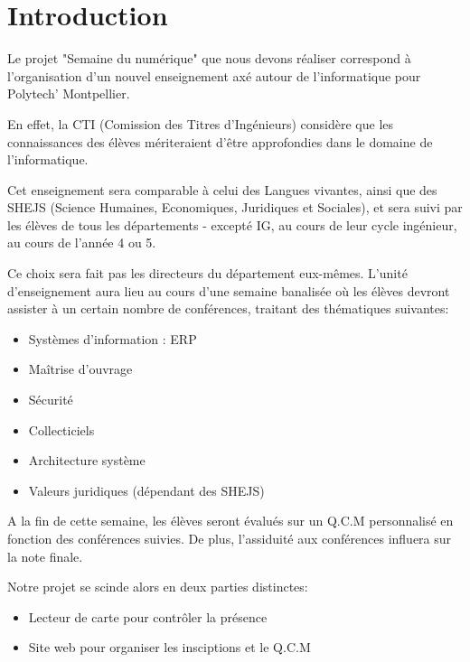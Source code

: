 \chapter{Introduction}

Le projet "Semaine du numérique" que nous devons réaliser correspond à l’organisation
d'un nouvel enseignement axé autour de l'informatique pour Polytech' Montpellier.

En effet, la CTI (Comission des Titres d'Ingénieurs) considère que les 
connaissances des élèves mériteraient d'être approfondies dans le domaine de l'informatique.

Cet enseignement sera comparable à celui des Langues vivantes, ainsi que des
SHEJS (Science Humaines, Economiques, Juridiques et Sociales), et sera suivi
par les élèves de tous les départements - excepté IG, au cours de leur cycle 
ingénieur, au cours de l'année 4 ou 5.

Ce choix sera fait pas les directeurs du département eux-mêmes. L'unité 
d'enseignement aura lieu au cours d'une semaine banalisée où les élèves 
devront assister à un certain nombre de conférences, traitant des thématiques 
suivantes:

\begin{itemize}
\item Systèmes d’information : ERP
\item Maîtrise d’ouvrage
\item Sécurité
\item Collecticiels
\item Architecture système
\item Valeurs juridiques (dépendant des SHEJS)
\end{itemize}

A la fin de cette semaine, les élèves seront évalués sur un Q.C.M personnalisé 
en fonction des conférences suivies. De plus, l'assiduité aux conférences influera
sur la note finale.

Notre projet se scinde alors en deux parties distinctes:

\begin{itemize}
\item Lecteur de carte pour contrôler la présence
\item Site web pour organiser les insciptions et le  Q.C.M
\end{itemize}

